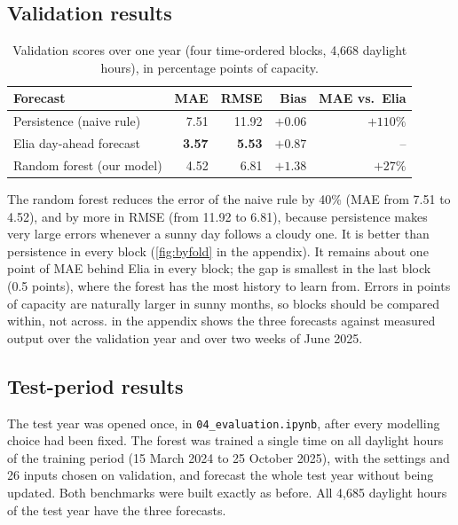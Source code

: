 \documentclass[11pt,a4paper]{article}
\begin{document}
\subsection{Validation results}

\begin{table}[ht]
\centering\small
\caption{Validation scores over one year (four time-ordered blocks, 4,668 daylight hours), in
percentage points of capacity.}
\label{tab:val}
\begin{tabular}{@{}l r r r r@{}}
\toprule
Forecast & MAE & RMSE & Bias & MAE vs.\ Elia \\
\midrule
Persistence (naive rule)   & 7.51 & 11.92 & $+0.06$ & $+110\%$ \\
Elia day-ahead forecast    & \textbf{3.57} & \textbf{5.53} & $+0.87$ & -- \\
Random forest (our model)  & 4.52 & 6.81 & $+1.38$ & $+27\%$ \\
\bottomrule
\end{tabular}
\end{table}


The random forest reduces the error of the naive rule by 40\% (MAE from 7.51 to 4.52), and by more
in RMSE (from 11.92 to 6.81), because persistence makes very large errors whenever a sunny day
follows a cloudy one. It is better than persistence in every block (\cref{fig:byfold} in the appendix). It remains
about one point of MAE behind Elia in every block; the gap is smallest in the last block (0.5
points), where the forest has the most history to learn from. Errors in points of capacity are
naturally larger in sunny months, so blocks should be compared within, not across.
 in the appendix shows the three forecasts against measured output over
the validation year and over two weeks of June 2025.

\subsection{Test-period results}

The test year was opened once, in \texttt{04\_evaluation.ipynb}, after every modelling choice had
been fixed. The forest was trained a single time on all daylight hours of the training period
(15 March 2024 to 25 October 2025), with the settings and 26 inputs chosen on validation, and
forecast the whole test year without being updated. Both benchmarks were built exactly as before.
All 4,685 daylight hours of the test year have the three forecasts.
\end{document}
